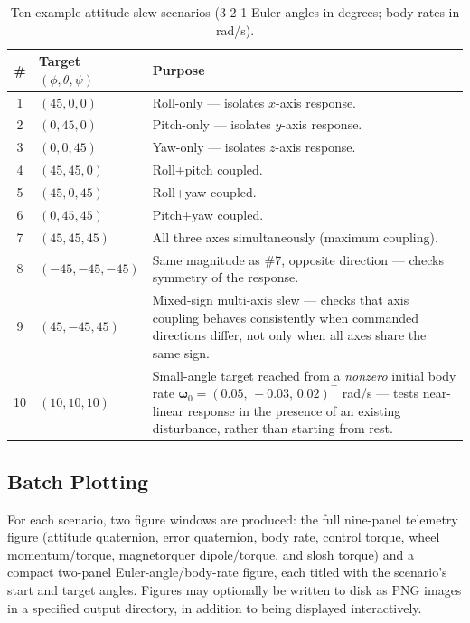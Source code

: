 \begin{table}[h]
\centering
\caption{Ten example attitude-slew scenarios (3-2-1 Euler angles in
degrees; body rates in rad/s).}
\label{tab:ten-scenarios}
\begin{tabular}{@{}clp{7.2cm}@{}}
\toprule
\textbf{\#} & \textbf{Target $(\phi,\theta,\psi)$} & \textbf{Purpose} \\
\midrule
1  & $(45,0,0)$      & Roll-only --- isolates $x$-axis response. \\
2  & $(0,45,0)$      & Pitch-only --- isolates $y$-axis response. \\
3  & $(0,0,45)$      & Yaw-only --- isolates $z$-axis response. \\
4  & $(45,45,0)$     & Roll+pitch coupled. \\
5  & $(45,0,45)$     & Roll+yaw coupled. \\
6  & $(0,45,45)$     & Pitch+yaw coupled. \\
7  & $(45,45,45)$    & All three axes simultaneously (maximum coupling). \\
8  & $(-45,-45,-45)$ & Same magnitude as \#7, opposite direction ---
                        checks symmetry of the response. \\
9  & $(45,-45,45)$   & Mixed-sign multi-axis slew --- checks that axis
                        coupling behaves consistently when commanded
                        directions differ, not only when all axes share
                        the same sign. \\
10 & $(10,10,10)$    & Small-angle target reached from a \emph{nonzero}
                        initial body rate $\bm{\omega}_0 = (0.05,\,
                        -0.03,\,0.02)^\top$ rad/s --- tests near-linear
                        response in the presence of an existing
                        disturbance, rather than starting from rest. \\
\bottomrule
\end{tabular}
\end{table}

\subsection{Batch Plotting}
\label{sec:batch-plot}

For each scenario, two figure windows are produced: the full
nine-panel telemetry figure (attitude quaternion, error quaternion, body
rate, control torque, wheel momentum/torque, magnetorquer dipole/torque,
and slosh torque) and a compact two-panel Euler-angle/body-rate figure,
each titled with the scenario's start and target angles. Figures may
optionally be written to disk as PNG images in a specified output
directory, in addition to being displayed interactively.


